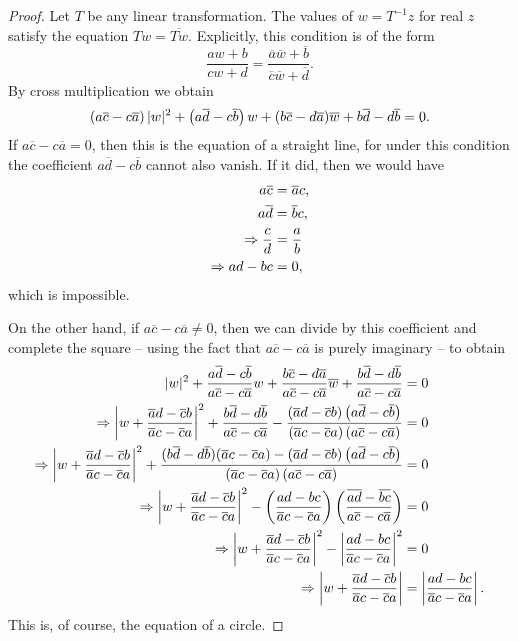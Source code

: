\begin{proof}
	Let $T$ be any linear transformation. The values of $w=T^{-1}z$ for real $z$ satisfy the equation $Tw=\overline{Tw}$. Explicitly, this condition is of the form $$\dfrac{aw+b}{cw+d}=\dfrac{\overline{a}\overline{w}+\overline{b}}{\overline{c}\overline{w}+\overline{d}}.$$ By cross multiplication we obtain $$\left(a\overline{c}-c\overline{a}\right)\lvert w \rvert^2+\left(a\overline{d}-c\overline{b}\right)w+(b\overline{c}-d\overline{a})\overline{w}+b\overline{d}-d\overline{b}=0.$$ If $a\overline{c}-c\overline{a}=0$, then this is the equation of a straight line, for under this condition the coefficient $a\overline{d}-c\overline{b}$ cannot also vanish. If it did, then we would have
	\begin{align*}
		a\overline{c} &=\overline{a}c, \\
		a\overline{d} &=\overline{b}c, \\
		\Rightarrow \dfrac{c}{d} &=\dfrac{a}{b} \\
		\Rightarrow ad-bc &=0,
	\end{align*}
	which is impossible.
	
	On the other hand, if $a\overline{c}-c\overline{a} \neq 0$, then we can divide by this coefficient and complete the square -- using the fact that $a\overline{c}-c\overline{a}$ is purely imaginary -- to obtain 
	\begin{align*}
		\lvert w \rvert^2+\dfrac{a\overline{d}-c\overline{b}}{a\overline{c}-c\overline{a}}w+\dfrac{b\overline{c}-d\overline{a}}{a\overline{c}-c\overline{a}}\overline{w}+\dfrac{b\overline{d}-d\overline{b}}{a\overline{c}-c\overline{a}} &=0 \\
		\Rightarrow \left\lvert w+\dfrac{\overline{a}d-\overline{c}b}{\overline{a}c-\overline{c}a}\right \rvert^2+\dfrac{b\overline{d}-d\overline{b}}{a\overline{c}-c\overline{a}} -\dfrac{\left(\overline{a}d-\overline{c}b\right)\left(a\overline{d}-c\overline{b}\right)}{\left(\overline{a}c-\overline{c}a\right)\left(a\overline{c}-c\overline{a}\right)} &=0 \\
		\Rightarrow \left\lvert w+\dfrac{\overline{a}d-\overline{c}b}{\overline{a}c-\overline{c}a}\right \rvert^2+\dfrac{(b\overline{d}-d\overline{b})(\overline{a}c-\overline{c}a)-\left(\overline{a}d-\overline{c}b\right)\left(a\overline{d}-c\overline{b}\right)}{\left(\overline{a}c-\overline{c}a\right)\left(a\overline{c}-c\overline{a}\right)} &=0 \\
		\Rightarrow \left\lvert w+\dfrac{\overline{a}d-\overline{c}b}{\overline{a}c-\overline{c}a}\right \rvert^2-\left(\dfrac{ad-bc}{\overline{a}c-\overline{c}a}\right)\left(\dfrac{\overline{ad}-\overline{bc}}{a\overline{c}-c\overline{a}}\right) &=0 \\ 
		\Rightarrow \left\lvert w+\dfrac{\overline{a}d-\overline{c}b}{\overline{a}c-\overline{c}a}\right \rvert^2-\left\lvert \dfrac{ad-bc}{\overline{a}c-\overline{c}a}\right \rvert^2 &=0 \\
		\Rightarrow \left\lvert w+\dfrac{\overline{a}d-\overline{c}b}{\overline{a}c-\overline{c}a}\right \rvert &=\left\lvert \dfrac{ad-bc}{\overline{a}c-\overline{c}a}\right \rvert.
	\end{align*}
	This is, of course, the equation of a circle.
\end{proof}

